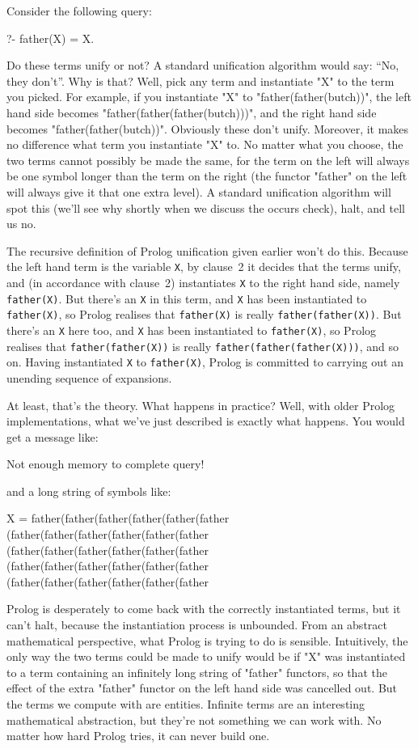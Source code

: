 Consider the following query:
\begin{LPNcodedisplay}
?- father(X) = X.
\end{LPNcodedisplay}
%
Do these terms unify or not?  A standard unification algorithm would
say: ``No, they don't''. Why is that? Well, pick any term and instantiate "X"
to the term you picked.  For example, if you instantiate "X" to
"father(father(butch))", the left hand side becomes
"father(father(father(butch)))", and the right hand side becomes
"father(father(butch))". Obviously these don't unify. Moreover, it
makes no difference what term you instantiate "X" to.  No matter what
you choose, the two terms cannot possibly be made the same, for the
term on the left will always be one symbol longer than the term on the
right (the functor "father" on the left will always give it that one
extra level). A standard unification
algorithm will spot this (we'll see why shortly when we discuss the
occurs check), halt, and tell us no.

The recursive definition of Prolog unification given earlier won't do
this. Because the left hand term is the variable \texttt{X}, by
clause~2 it decides that the terms  unify, and (in
accordance with clause~2) instantiates \texttt{X} to the right hand
side, namely \texttt{father(X)}. But there's an \texttt{X} in this
term, and \texttt{X} has been instantiated to \texttt{father(X)}, so
Prolog realises that \texttt{father(X)} is really
\texttt{father(father(X))}.  But there's an \texttt{X} here too, and
\texttt{X} has been instantiated to \texttt{father(X)}, so Prolog
realises that \texttt{father(father(X))} is really
\texttt{father(father(father(X)))}, and so on. Having instantiated
\texttt{X} to \texttt{father(X)}, Prolog is committed to carrying out
an unending sequence of expansions.

At least, that's the theory. What happens in practice?  Well, with
older Prolog implementations, what we've just described is exactly
what happens.  You would get a message like:
\begin{LPNcodedisplay}
Not enough memory to complete query!
\end{LPNcodedisplay}
%
and a long string of symbols like:
\begin{LPNcodedisplay}
X = father(father(father(father(father(father
   (father(father(father(father(father(father
   (father(father(father(father(father(father
   (father(father(father(father(father(father
   (father(father(father(father(father(father
\end{LPNcodedisplay}
Prolog is desperately  to come back with the correctly
instantiated terms, but it can't halt, because the instantiation
process is unbounded. From an abstract mathematical perspective, what
Prolog is trying to do  is sensible. Intuitively, the only way the
two terms could be made to unify would be if "X" was instantiated to a
term containing an infinitely long string of "father" functors, so
that the effect of the extra "father" functor on the left hand side
was cancelled out.  But the terms we compute with are 
entities. Infinite terms are an interesting mathematical abstraction,
but they're not something we can work with.  No matter how hard Prolog
tries, it can never build one.

